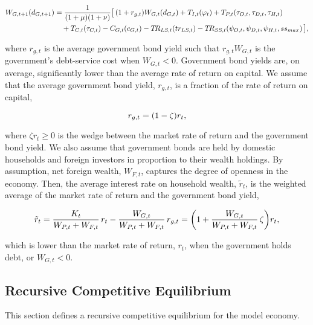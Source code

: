 \documentclass[11pt,leqno,fleqn]{article}
\newcommand{\be}{\vspace{-1em}\begin{singlespace}\begin{equation}}
\newcommand{\ee}{\end{equation}\end{singlespace}}
\begin{document}
\begin{align}	
	W_{G,t+1}(d_{G,t+1})&=\frac{1}{(1+\mu)(1+\nu)}\bigl[\,
	(1+r_{g,t})W_{G,t}(d_{G,t})+T_{I,t}(\varphi_{t})
	+T_{P,t}(\tau_{O,t},\tau_{D,t},\tau_{H,t})\label{E:wlt_g}\\
	&\quad+T_{C,t}(\tau_{C,t})
	-C_{G,t}(c_{G,t})-T\!R_{LS,t}(tr_{LS,t})
	-T\!R_{SS,t}(\psi_{O,t},\psi_{D,t},\psi_{H,t},ss_{max})
	\,\bigr],\notag
\end{align}

where $r_{g,t}$ is the average government bond yield such that $r_{g,t}W_{G,t}$ is the government's debt-service cost when $W_{G,t}<0$. Government bond yields are, on average, significantly lower than the average rate of return on capital. We assume that the average government bond yield, $r_{g,t}$, is a fraction of the rate of return on capital,

\be	r_{g,t}=(1-\zeta)r_{t}, \notag \ee

where $\zeta r_{t}\geq 0$ is the wedge between the market rate of return and the government bond yield. We also assume that government bonds are held by domestic households and foreign investors in proportion to their wealth holdings. By assumption, net foreign wealth, $W_{F,t}$, captures the degree of openness in the economy. Then, the average interest rate on household wealth, $\tilde{r}_{t}$, is the weighted average of the market rate of return and the government bond yield,

\be \tilde{r}_{t}=\frac{K_{t}}{W_{P,t}+W_{F,t}}\,r_{t}-\frac{W_{G,t}}{W_{P,t}+W_{F,t}}\,r_{g,t}
	=\biggl(1+\frac{W_{G,t}}{W_{P,t}+W_{F,t}}\,\zeta\biggr)r_{t}, \notag \ee
	
which is lower than the market rate of return, $r_{t}$, when the government holds debt, or $W_{G,t}<0$.

\subsection{Recursive Competitive Equilibrium}
This section defines a recursive competitive equilibrium for the model economy.
\end{document}
